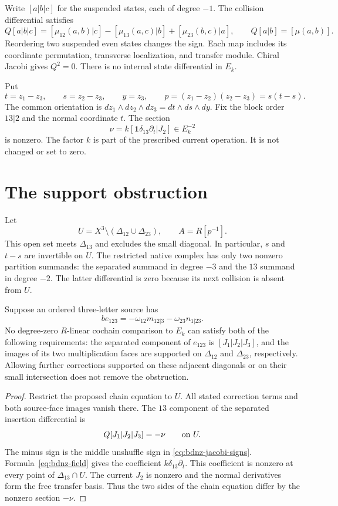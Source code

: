 Write $[a|b|c]$ for the suspended states, each of degree $-1$.
The collision differential satisfies
\begin{equation}\label{eq:bdnz-jacobi-signs}
 Q[a|b|c]=[\mu_{12}(a,b)|c]-[\mu_{13}(a,c)|b]
                      +[\mu_{23}(b,c)|a],
 \qquad Q[a|b]=[\mu(a,b)].
\end{equation}
Reordering two suspended even states changes the sign.
Each map includes its coordinate permutation, transverse localization, and transfer module.
Chiral Jacobi gives $Q^2=0$.
There is no internal state differential in $E_k$.

Put
\[
 t=z_1-z_3,\qquad s=z_2-z_3,\qquad y=z_3,
 \qquad p=(z_1-z_2)(z_2-z_3)=s(t-s).
\]
The common orientation is $dz_1\wedge dz_2\wedge dz_3=dt\wedge ds\wedge dy$.
Fix the block order $13|2$ and the normal coordinate $t$.
The section
\begin{equation}\label{eq:bdnz-nu}
 \nu=k[\mathbf1\delta_{13}\partial_t|J_2]\in E_k^{-2}
\end{equation}
is nonzero.
The factor $k$ is part of the prescribed current operation.
It is not changed or set to zero.

\section{The support obstruction}

Let
\[
 U=X^3\setminus(\Delta_{12}\cup\Delta_{23}),
 \qquad A=R[p^{-1}].
\]
This open set meets $\Delta_{13}$ and excludes the small diagonal.
In particular, $s$ and $t-s$ are invertible on $U$.
The restricted native complex has only two nonzero partition summands:
the separated summand in degree $-3$ and the $13$ summand in degree $-2$.
The latter differential is zero because its next collision is absent from $U$.

\begin{theorem}\label{thm:bdnz-support}
Suppose an ordered three-letter source has
\[
 be_{123}=-\omega_{12}m_{12|3}-\omega_{23}n_{1|23}.
\]
No degree-zero $R$-linear cochain comparison to $E_k$ can satisfy both of the following requirements:
the separated component of $e_{123}$ is $[J_1|J_2|J_3]$,
and the images of its two multiplication faces are supported on $\Delta_{12}$ and $\Delta_{23}$, respectively.
Allowing further corrections supported on these adjacent diagonals or on their small intersection does not remove the obstruction.
\end{theorem}
\begin{proof}
Restrict the proposed chain equation to $U$.
All stated correction terms and both source-face images vanish there.
The $13$ component of the separated insertion differential is
\[
 Q[J_1|J_2|J_3]=-\nu\qquad\hbox{on }U.
\]
The minus sign is the middle unshuffle sign in \eqref{eq:bdnz-jacobi-signs}.
Formula~\eqref{eq:bdnz-field} gives the coefficient $k\delta_{13}\partial_t$.
This coefficient is nonzero at every point of $\Delta_{13}\cap U$.
The current $J_2$ is nonzero and the normal derivatives form the free transfer basis.
Thus the two sides of the chain equation differ by the nonzero section $-\nu$.
\end{proof}

